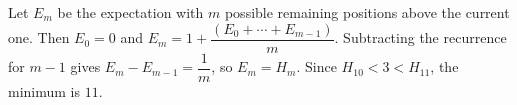 Let $E_m$ be the expectation with $m$ possible remaining positions above the current one. Then $E_0=0$ and $E_m=1+\dfrac{(E_0+\cdots+E_{m-1})}{m}$. Subtracting the recurrence for $m-1$ gives $E_m-E_{m-1}=\dfrac{1}{m}$, so $E_m=H_m$. Since $H_{10}<3<H_{11}$, the minimum is $\boxed{11}$.
